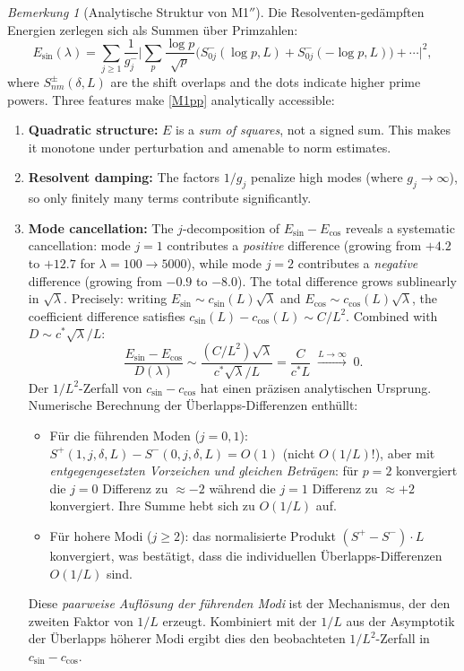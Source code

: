 ﻿\documentclass[12pt,a4paper]{article}
\theoremstyle{definition}
\theoremstyle{remark}
\newtheorem{remark}[theorem]{Bemerkung}
\begin{document}
\begin{remark}[Analytische Struktur von M1$''$]
\label{rem:M1-analytical}
Die Resolventen-gedämpften Energien zerlegen sich als Summen über Primzahlen:
\[
  E_{\sin}(\lambda) = \sum_{j \geq 1} \frac{1}{g_j^-}
  \biggl|\sum_p \frac{\log p}{\sqrt{p}}
  \bigl(S^-_{0j}(\log p, L) + S^-_{0j}(-\log p, L)\bigr) + \cdots\biggr|^2,
\]
where $S^\pm_{nm}(\delta, L)$ are the shift overlaps and the dots indicate higher prime powers. Three features make \ref{M1pp} analytically accessible:
\begin{enumerate}
  \item \textbf{Quadratic structure:} $E$ is a \emph{sum of squares}, not a signed sum. This makes it monotone under perturbation and amenable to norm estimates.
  \item \textbf{Resolvent damping:} The factors $1/g_j$ penalize high modes (where $g_j \to \infty$), so only finitely many terms contribute significantly.
  \item \textbf{Mode cancellation:} The $j$-decomposition of $E_{\sin} - E_{\cos}$ reveals a systematic cancellation: mode $j = 1$ contributes a \emph{positive} difference (growing from $+4.2$ to $+12.7$ for $\lambda = 100 \to 5000$), while mode $j = 2$ contributes a \emph{negative} difference (growing from $-0.9$ to $-8.0$). The total difference grows sublinearly in $\sqrt{\lambda}$. Precisely: writing $E_{\sin} \sim c_{\sin}(L)\sqrt{\lambda}$ and $E_{\cos} \sim c_{\cos}(L)\sqrt{\lambda}$, the coefficient difference satisfies $c_{\sin}(L) - c_{\cos}(L) \sim C/L^2$. Combined with $D \sim c^*\sqrt{\lambda}/L$:
  \[
    \frac{E_{\sin} - E_{\cos}}{D(\lambda)} \sim \frac{(C/L^2)\sqrt{\lambda}}{c^*\sqrt{\lambda}/L} = \frac{C}{c^* L} \;\xrightarrow{L \to \infty}\; 0.
  \]
  Der $1/L^2$-Zerfall von $c_{\sin} - c_{\cos}$ hat einen präzisen analytischen Ursprung. Numerische Berechnung der Überlapps-Differenzen enthüllt:
  \begin{itemize}
    \item Für die führenden Moden ($j = 0, 1$): $S^+(1,j,\delta,L) - S^-(0,j,\delta,L) = O(1)$ (nicht $O(1/L)$!), aber mit \emph{entgegengesetzten Vorzeichen und gleichen Beträgen}: für $p = 2$ konvergiert die $j = 0$ Differenz zu $\approx -2$ während die $j = 1$ Differenz zu $\approx +2$ konvergiert. Ihre Summe hebt sich zu $O(1/L)$ auf.
    \item Für hohere Modi ($j \geq 2$): das normalisierte Produkt $(S^+ - S^-) \cdot L$ konvergiert, was bestätigt, dass die individuellen Überlapps-Differenzen $O(1/L)$ sind.
  \end{itemize}
  Diese \emph{paarweise Auflösung der führenden Modi} ist der Mechanismus, der den zweiten Faktor von $1/L$ erzeugt. Kombiniert mit der $1/L$ aus der Asymptotik der Überlapps höherer Modi ergibt dies den beobachteten $1/L^2$-Zerfall in $c_{\sin} - c_{\cos}$.
\end{enumerate}
\end{remark}
\end{document}
